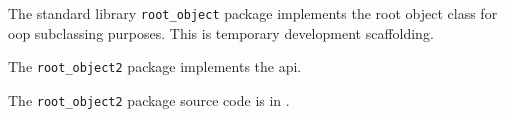 
The standard library {\tt root\_object} package implements the root object class for oop subclassing purposes.
This is temporary development scaffolding.

The {\tt root\_object2} package implements the  api.

The {\tt root\_object2} package source code is in .




